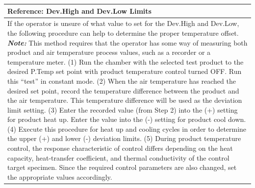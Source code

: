 \begin{longtable}[]{@{}l@{}}
\toprule
\begin{minipage}[b]{0.97\columnwidth}\raggedright
\textbf{Reference}: Dev.High and Dev.Low Limits\strut
\end{minipage}\tabularnewline
\midrule
\endhead
\begin{minipage}[t]{0.97\columnwidth}\raggedright
If the operator is unsure of what value to set for the Dev.High and
Dev.Low, the following procedure can help to determine the proper
temperature offset. \textbf{\emph{Note:}} This method requires that the
operator has some way of measuring both product and air temperature
process values, such as a recorder or a temperature meter. (1) Run the
chamber with the selected test product to the desired P.Temp set point
with product temperature control turned OFF. Run this ``test'' in
constant mode. (2) When the air temperature has reached the desired set
point, record the temperature difference between the product and the air
temperature. This temperature difference will be used as the deviation
limit setting. (3) Enter the recorded value (from Step 2) into the (+)
setting for product heat up. Enter the value into the (-) setting for
product cool down. (4) Execute this procedure for heat up and cooling
cycles in order to determine the upper (+) and lower (-) deviation
limits. (5) During product temperature control, the response
characteristic of control differs depending on the heat capacity,
heat-transfer coefficient, and thermal conductivity of the control
target specimen. Since the required control parameters are also changed,
set the appropriate values accordingly.\strut
\end{minipage}\tabularnewline
\bottomrule
\end{longtable}

